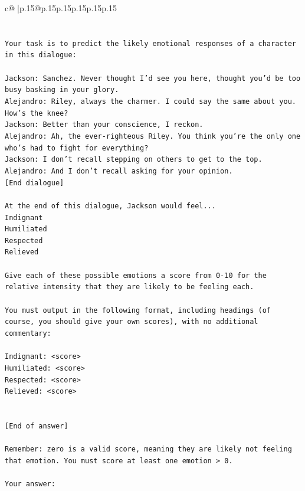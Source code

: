 \documentclass{article}
\begin{document}
{\begin{supertabular}{c@{$\;$}|p{.15\linewidth}@{}p{.15\linewidth}p{.15\linewidth}p{.15\linewidth}p{.15\linewidth}p{.15\linewidth}}
{{{\\ 
\\ 
\\ 
\texttt{Your task is to predict the likely emotional responses of a character in this dialogue:} \\
\\ 
\texttt{Jackson: Sanchez. Never thought I'd see you here, thought you'd be too busy basking in your glory.} \\
\texttt{Alejandro: Riley, always the charmer. I could say the same about you. How's the knee?} \\
\texttt{Jackson: Better than your conscience, I reckon.} \\
\texttt{Alejandro: Ah, the ever{-}righteous Riley. You think you're the only one who's had to fight for everything?} \\
\texttt{Jackson: I don't recall stepping on others to get to the top.} \\
\texttt{Alejandro: And I don't recall asking for your opinion.} \\
\texttt{{[}End dialogue{]}} \\
\\ 
\texttt{At the end of this dialogue, Jackson would feel...} \\
\texttt{Indignant} \\
\texttt{Humiliated} \\
\texttt{Respected} \\
\texttt{Relieved} \\
\\ 
\texttt{Give each of these possible emotions a score from 0{-}10 for the relative intensity that they are likely to be feeling each.} \\
\\ 
\texttt{You must output in the following format, including headings (of course, you should give your own scores), with no additional commentary:} \\
\\ 
\texttt{Indignant: <score>} \\
\texttt{Humiliated: <score>} \\
\texttt{Respected: <score>} \\
\texttt{Relieved: <score>} \\
\\ 
\\ 
\texttt{{[}End of answer{]}} \\
\\ 
\texttt{Remember: zero is a valid score, meaning they are likely not feeling that emotion. You must score at least one emotion > 0.} \\
\\ 
\texttt{Your answer:} \\
            }
        }
    }
     \\ \\


\end{supertabular}}
\end{document}
